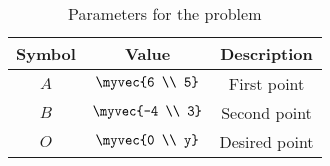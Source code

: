 \begin{table}[H]
\centering
\begin{tabular}{|c|c|c|}
\hline
\textbf{Symbol} & \textbf{Value} & \textbf{Description} \\
\hline
$A$ & $\myvec{6 \\ 5}$ & First point \\
\hline
$B$ & $\myvec{-4 \\ 3}$ & Second point \\
\hline
$O$ & $\myvec{0 \\ y}$ & Desired point \\
\hline
\end{tabular}
\caption{Parameters for the problem}
\end{table}
